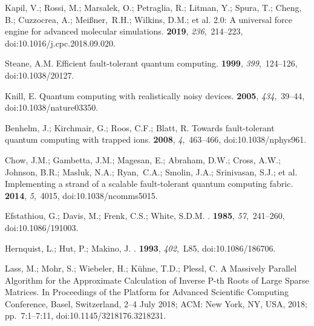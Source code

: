 \documentclass[computation,article,accept,moreauthors,pdftex]{Definitions/mdpi}
\begin{document}
\begin{thebibliography}{999}
Kapil, V.; Rossi, M.; Marsalek, O.; Petraglia, R.; Litman, Y.; Spura, T.;
 Cheng, B.; Cuzzocrea, A.; Mei{\ss}ner,~R.H.; Wilkins, D.M.; et al.
 2.0: A universal force engine for advanced molecular
 simulations.
 {\bf 2019}, {\em 236},~214--223, doi:10.1016/j.cpc.2018.09.020.

Steane, A.M.
\newblock Efficient fault-tolerant quantum computing.
 {\bf 1999}, {\em 399},~124--126, doi:10.1038/20127.

Knill, E.
\newblock Quantum computing with realistically noisy devices.
 {\bf 2005}, {\em 434},~39--44, doi:10.1038/nature03350.

Benhelm, J.; Kirchmair, G.; Roos, C.F.; Blatt, R.
\newblock Towards fault-tolerant quantum computing with trapped ions.
 {\bf 2008}, {\em 4},~463--466, doi:10.1038/nphys961.

Chow, J.M.; Gambetta, J.M.; Magesan, E.; Abraham, D.W.; Cross, A.W.; Johnson,
 B.R.; Masluk, N.A.; Ryan,~C.A.; Smolin, J.A.; Srinivasan, S.J.; et al.
\newblock Implementing a strand of a scalable fault-tolerant quantum computing
 fabric.
 {\bf 2014}, {\em 5},~4015, doi:10.1038/ncomms5015.

{Efstathiou}, G.; {Davis}, M.; {Frenk}, C.S.; {White}, S.D.M.
.
 {\bf 1985}, {\em 57},~241--260, doi:10.1086/191003.

{Hernquist}, L.; {Hut}, P.; {Makino}, J.
.
 {\bf 1993}, {\em 402},~L85, doi:10.1086/186706.

Lass, M.; Mohr, S.; Wiebeler, H.; K\"{u}hne, T.D.; Plessl, C.
\newblock A Massively Parallel Algorithm for the Approximate Calculation of
 Inverse P-th Roots of Large Sparse Matrices.
\newblock In Proceedings of the Platform for Advanced Scientific Computing Conference, Basel, Switzerland, 2--4 July 2018; ACM:
 New York, NY, USA, 2018; pp.~7:1--7:11, doi:10.1145/3218176.3218231.

\end{thebibliography}
\end{document}
